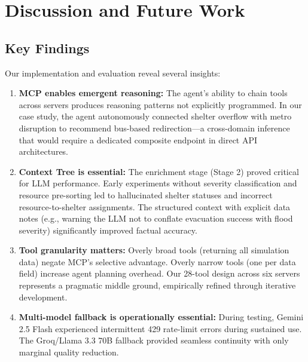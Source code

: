 \documentclass[journal]{IEEEtran}
\begin{document}
\section{Discussion and Future Work}
\label{sec:discussion}

\subsection{Key Findings}
Our implementation and evaluation reveal several insights:

\begin{enumerate}[leftmargin=*]
    \item \textbf{MCP enables emergent reasoning:} The agent's ability to
    chain tools across servers produces reasoning patterns not explicitly
    programmed. In our case study, the agent autonomously connected shelter
    overflow with metro disruption to recommend bus-based redirection---a
    cross-domain inference that would require a dedicated composite endpoint
    in direct API architectures.

    \item \textbf{Context Tree is essential:} The enrichment stage (Stage 2)
    proved critical for LLM performance. Early experiments without severity
    classification and resource pre-sorting led to hallucinated shelter
    statuses and incorrect resource-to-shelter assignments. The structured
    context with explicit data notes (e.g., warning the LLM not to conflate
    evacuation success with flood severity) significantly improved factual
    accuracy.

    \item \textbf{Tool granularity matters:} Overly broad tools (returning
    all simulation data) negate MCP's selective advantage. Overly narrow
    tools (one per data field) increase agent planning overhead. Our 28-tool
    design across six servers represents a pragmatic middle ground,
    empirically refined through iterative development.

    \item \textbf{Multi-model fallback is operationally essential:} During
    testing, Gemini 2.5 Flash experienced intermittent 429 rate-limit errors
    during sustained use. The Groq/Llama 3.3 70B fallback provided seamless
    continuity with only marginal quality reduction.
\end{enumerate}
\end{document}
